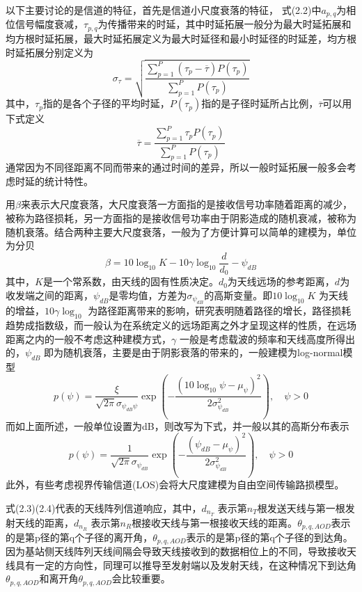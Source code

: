 \documentclass[bachelor,nocolorlinks, printoneside]{seuthesis} %
\begin{document}
\begin{Main}
以下主要讨论的是信道的特征，首先是信道小尺度衰落的特征，
式(2.2)中$a_{p,q}$为相位信号幅度衰减，$\tau_{p,q}$为传播带来的时延，其中时延拓展一般分为最大时延拓展和均方根时延拓展，最大时延拓展定义为最大时延径和最小时延径的时延差，均方根时延拓展分别定义为
\begin{equation}\label{key}
\sigma_{\tau} = \sqrt{ 
	\frac{
		\sum_{p=1}^{P}(\tau_{p}-\overline{\tau})P(\tau_{p})
	}
	{
		\sum_{p=1}^{P}
		P(\tau_{p})
	}
}
\end{equation}
其中，$\tau_p$指的是各个子径的平均时延，$P(\tau_{p})$指的是子径时延所占比例，$\overline{\tau}$可以用下式定义
\begin{equation}\label{key}
\overline{\tau}=\frac
{\sum^{P}_{p=1}\tau_{p}P(\tau_{p})}
{\sum_{p=1}^{P}P(\tau_{p})}
\end{equation}
通常因为不同径距离不同而带来的通过时间的差异，所以一般时延拓展一般多会考虑时延的统计特性。

用$\beta$来表示大尺度衰落，大尺度衰落一方面指的是接收信号功率随着距离的减少，被称为路径损耗，另一方面指的是接收信号功率由于阴影造成的随机衰减，被称为随机衰落。结合两种主要大尺度衰落，一般为了方便计算可以简单的建模为，单位为分贝
\begin{equation}\label{key}
\beta=10 \log_{10} K-10 \gamma \log_{10} \frac{d}{d_{0}}-\psi_{dB}
\end{equation}
其中，$K$是一个常系数，由天线的固有性质决定。$d_{0}$为天线远场的参考距离，$d$为收发端之间的距离，$\psi_{dB}$是零均值，方差为$\sigma_{\psi_{dB}}$的高斯变量。即$10 \log_{10} K $ 为天线的增益，$ 10 \gamma \log_{10}$ 为路径距离带来的影响，研究表明随着路径的增长，路径损耗趋势成指数级，而一般认为在系统定义的远场距离之外才呈现这样的性质，在远场距离之内的一般不考虑这种建模方式，$\gamma$ 一般是考虑载波的频率和天线高度所得出的，$ \psi_{dB}$ 即为随机衰落，主要是由于阴影衰落的带来的，一般建模为log-normal模型
\begin{equation}\label{key}
p(\psi)=\frac{\xi}{\sqrt{2\pi}\sigma_{\psi_{dB}\psi}}\exp\left({-\frac{(10\log_10 \psi - \mu_\psi)^{2}}{2\sigma_{\psi_{dB}}^{2}}}\right),\quad \psi > 0
\end{equation}
而如上面所述，一般单位设置为dB，则改写为下式，并一般以其的高斯分布表示
\begin{equation}\label{key}
p(\psi)=\frac{1}{\sqrt{2\pi}\sigma_{\psi_{dB}}}\exp\left({-\frac{(\psi_{dB} - \mu_\psi)^{2}}{2\sigma_{\psi_{dB}}^{2}}}\right),\quad \psi > 0
\end{equation}
此外，有些考虑视界传输信道(LOS)会将大尺度建模为自由空间传输路损模型。

式(2.3)(2.4)代表的天线阵列信道响应，其中，$d_{n_{T}}$ 表示第$n_{T}$根发送天线与第一根发射天线的距离，$d_{n_{R}}$ 表示第$n_{R}$根接收天线与第一根接收天线的距离。$\theta_{p,q,AOD}$表示的是第p径的第q个子径的离开角，$\theta_{p,q,AOD}$表示的是第p径的第q个子径的到达角。因为基站侧天线阵列天线间隔会导致天线接收到的数据相位上的不同，导致接收天线具有一定的方向性，同理可以推导至发射端以及发射天线，在这种情况下到达角$\theta_{p,q,AOD}$和离开角$\theta_{p,q,AOD}$会比较重要。


\end{Main}
\end{document}
